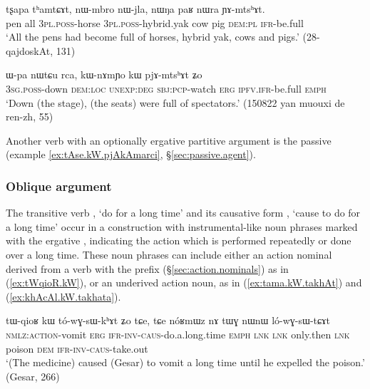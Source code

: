 \begin{exe}
\ex \label{ex:YAmtshAt}
\gll tʂapa tʰamtɕɤt, nɯ-mbro nɯ-jla, nɯŋa paʁ nɯra ɲɤ-mtsʰɤt. \\
pen all \textsc{3pl}.\textsc{poss}-horse \textsc{3pl}.\textsc{poss}-hybrid.yak cow pig \textsc{dem}:\textsc{pl} \textsc{ifr}-be.full \\
\glt `All the pens had become full of horses, hybrid yak, cows and pigs.' (28-qajdoskAt, 131)
\end{exe}


\begin{exe}
\ex \label{ex:kW.pjAmtshAt}
\gll  ɯ-pa nɯtɕu rca, kɯ-nɤmɲo kɯ pjɤ-mtsʰɤt ʑo \\
\textsc{3sg}.\textsc{poss}-down \textsc{dem}:\textsc{loc} \textsc{unexp}:\textsc{deg} \textsc{sbj}:\textsc{pcp}-watch \textsc{erg} \textsc{ipfv}.\textsc{ifr}-be.full \textsc{emph} \\
\glt `Down (the stage), (the seats) were full of spectators.' (150822 yan muouxi de ren-zh, 55)
\end{exe}

Another verb with an optionally ergative partitive argument is the passive  (example \ref{ex:tAse.kW.pjAkAmarci}, §\ref{sec:passive.agent}).

\subsubsection{Oblique argument} \label{sec:oblique.kW}
 The transitive verb , `do for a long time' and its causative form , `cause to do for a long time' occur in a construction with instrumental-like noun phrases marked with the ergative , indicating the action which is performed repeatedly or done over a long time. These noun phrases can include either an action nominal derived from a verb with the prefix  (§\ref{sec:action.nominals}) as in (\ref{ex:tWqioR.kW}), or an underived action noun, as in (\ref{ex:tama.kW.takhAt}) and (\ref{ex:khAcAl.kW.takhata}).  
 
  \begin{exe}
\ex \label{ex:tWqioR.kW}
\gll tɯ-qioʁ kɯ tó-wɣ-sɯ-kʰɤt ʑo tɕe, tɕe nóʁmɯz nɤ tɯɣ nɯnɯ ló-wɣ-sɯ-tɕɤt  \\
\textsc{nmlz}:\textsc{action}-vomit \textsc{erg} \textsc{ifr}-\textsc{inv}-\textsc{caus}-do.a.long.time \textsc{emph} \textsc{lnk} \textsc{lnk} only.then \textsc{lnk} poison \textsc{dem} \textsc{ifr}-\textsc{inv}-\textsc{caus}-take.out \\
\glt `(The medicine) caused (Gesar) to vomit a long time until he expelled the poison.' (Gesar, 266)
\end{exe}

